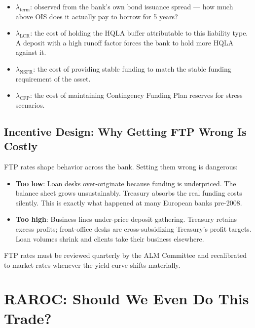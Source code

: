 \documentclass[12pt,a4paper]{article}
\begin{document}
\begin{itemize}[noitemsep]
  \item $\lambda_{\text{term}}$: observed from the bank's own bond issuance
        spread --- how much above OIS does it actually pay to borrow for
        5 years?
  \item $\lambda_{\text{LCR}}$: the cost of holding the HQLA buffer attributable
        to this liability type.  A deposit with a high runoff factor forces the
        bank to hold more HQLA against it.
  \item $\lambda_{\text{NSFR}}$: the cost of providing stable funding to match
        the stable funding requirement of the asset.
  \item $\lambda_{\text{CFP}}$: the cost of maintaining Contingency Funding Plan
        reserves for stress scenarios.
\end{itemize}

\subsection{Incentive Design: Why Getting FTP Wrong Is Costly}

FTP rates shape behavior across the bank.  Setting them wrong is dangerous:

\begin{itemize}[noitemsep]
  \item \textbf{Too low}: Loan desks over-originate because funding is
        underpriced.  The balance sheet grows unsustainably.  Treasury
        absorbs the real funding costs silently.  This is exactly what
        happened at many European banks pre-2008.
  \item \textbf{Too high}: Business lines under-price deposit gathering.
        Treasury retains excess profits; front-office desks are
        cross-subsidizing Treasury's profit targets.  Loan volumes shrink
        and clients take their business elsewhere.
\end{itemize}

FTP rates must be reviewed quarterly by the ALM Committee and
recalibrated to market rates whenever the yield curve shifts materially.

\section{RAROC: Should We Even Do This Trade?}
\end{document}
